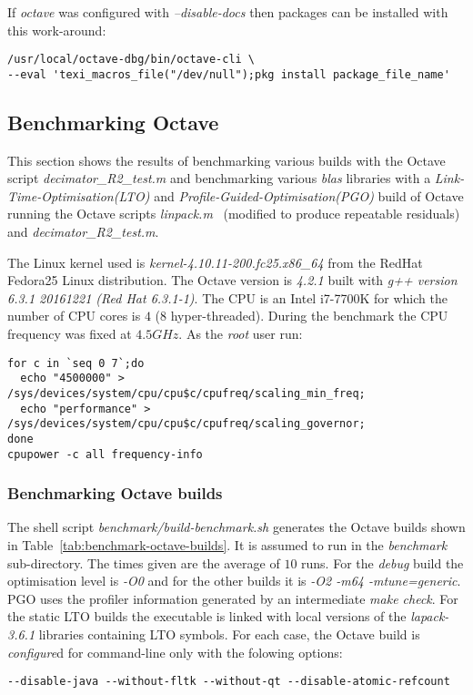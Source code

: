\documentclass[a4paper,twoside,10pt,english]{report}
\begin{document}
If \emph{octave} was configured with \emph{--disable-docs} then packages can 
be installed with this work-around:
\begin{small}
\begin{verbatim}
/usr/local/octave-dbg/bin/octave-cli \
--eval 'texi_macros_file("/dev/null");pkg install package_file_name'
\end{verbatim}
\end{small}
\subsection*{Benchmarking Octave}
This section shows the results of benchmarking various builds with the
Octave script \emph{decimator\_R2\_test.m} and benchmarking various \emph{blas}
libraries with a \emph{Link-Time-Optimisation(LTO)} and 
\emph{Profile-Guided-Optimisation(PGO)} build of Octave running the Octave 
scripts \emph{linpack.m}~\cite{Rutter_LinpackBenchmark} (modified to produce 
repeatable residuals) and \emph{decimator\_R2\_test.m}.

The Linux kernel used is \emph{kernel-4.10.11-200.fc25.x86\_64} from the RedHat 
Fedora25 Linux distribution. The Octave version is \emph{4.2.1} built with 
\emph{g++ version 6.3.1 20161221 (Red Hat 6.3.1-1)}. 
The CPU is an Intel i7-7700K for which the number of CPU cores is $4$ ($8$
hyper-threaded). During the benchmark the CPU frequency was fixed at $4.5GHz$.
As the \emph{root} user run:
\begin{small}
\begin{verbatim}
for c in `seq 0 7`;do 
  echo "4500000" > /sys/devices/system/cpu/cpu$c/cpufreq/scaling_min_freq; 
  echo "performance" > /sys/devices/system/cpu/cpu$c/cpufreq/scaling_governor;
done
cpupower -c all frequency-info
\end{verbatim}
\end{small}
 
\subsubsection*{Benchmarking Octave builds}
The shell script \emph{benchmark/build-benchmark.sh} generates the Octave builds
shown in Table~\ref{tab:benchmark-octave-builds}. It is assumed to run in the
\emph{benchmark} sub-directory. The times given are the average of $10$ runs.
For the \emph{debug} build the optimisation level is \emph{-O0} and for the
other builds it is \emph{-O2 -m64 -mtune=generic}. PGO uses the profiler 
information generated by an intermediate \emph{make check}. For the
static LTO builds the executable is linked with local versions of the 
\emph{lapack-3.6.1} libraries containing LTO symbols.
For each case, the Octave build is \emph{configure}d for command-line only 
with the folowing options:
\begin{small}
\begin{verbatim}
--disable-java --without-fltk --without-qt --disable-atomic-refcount
\end{verbatim}
\end{small}
\end{document}
